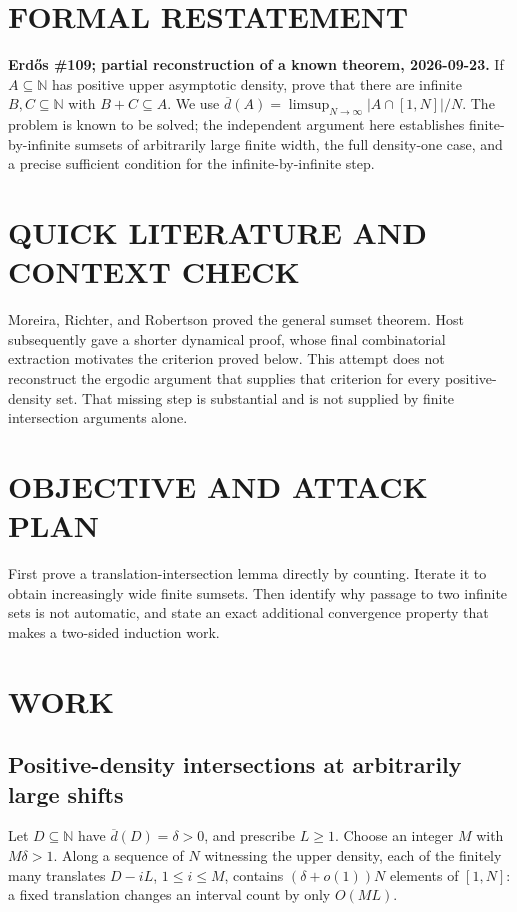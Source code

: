 \section{FORMAL RESTATEMENT}
\textbf{Erd\H{o}s \#109; partial reconstruction of a known theorem, 2026-09-23.}
If $A\subseteq\mathbb N$ has positive upper asymptotic density, prove that there are infinite $B,C\subseteq\mathbb N$ with $B+C\subseteq A$. We use $\overline d(A)=\limsup_{N\to\infty}|A\cap[1,N]|/N$. The problem is known to be solved; the independent argument here establishes finite-by-infinite sumsets of arbitrarily large finite width, the full density-one case, and a precise sufficient condition for the infinite-by-infinite step.

\section{QUICK LITERATURE AND CONTEXT CHECK}
Moreira, Richter, and Robertson proved the general sumset theorem. Host subsequently gave a shorter dynamical proof, whose final combinatorial extraction motivates the criterion proved below. This attempt does not reconstruct the ergodic argument that supplies that criterion for every positive-density set. That missing step is substantial and is not supplied by finite intersection arguments alone.

\section{OBJECTIVE AND ATTACK PLAN}
First prove a translation-intersection lemma directly by counting. Iterate it to obtain increasingly wide finite sumsets. Then identify why passage to two infinite sets is not automatic, and state an exact additional convergence property that makes a two-sided induction work.

\section{WORK}
\subsection{Positive-density intersections at arbitrarily large shifts}
Let $D\subseteq\mathbb N$ have $\overline d(D)=\delta>0$, and prescribe $L\geq1$. Choose an integer $M$ with $M\delta>1$. Along a sequence of $N$ witnessing the upper density, each of the finitely many translates $D-iL$, $1\leq i\leq M$, contains $(\delta+o(1))N$ elements of $[1,N]$: a fixed translation changes an interval count by only $O(ML)$.

